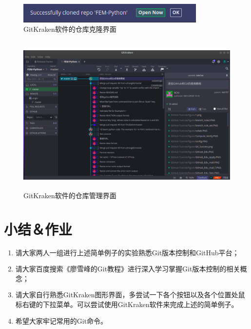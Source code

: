 \documentclass[a4paper,14pt]{article}
\begin{document}
\begin{enumerate}[1.]
    \begin{figure}[htbp]
        \centering
        \includegraphics[height=1cm]{figure/GitKraken_open.png}
        \caption{GitKraken软件的仓库克隆界面}
    \end{figure}

    \begin{figure}[htbp]
        \centering
        \includegraphics[height=8cm]{figure/GitKraken_repo.png}
        \caption{GitKraken软件的仓库管理界面}
    \end{figure}
\end{enumerate}

\newpage
\section{小结＆作业}
\begin{enumerate}[1. ]
\item 请大家两人一组进行上述简单例子的实验熟悉Git版本控制和GitHub平台；
\item 请大家百度搜索《廖雪峰的Git教程》进行深入学习掌握Git版本控制的相关概念；
\item 请大家自行熟悉GitKraken图形界面，多尝试一下各个按钮以及各个位置处鼠标右键的下拉菜单。可以尝试使用GitKraken软件来完成上述的简单例子。
\item 希望大家牢记常用的Git命令。
\end{enumerate}
\end{document}
